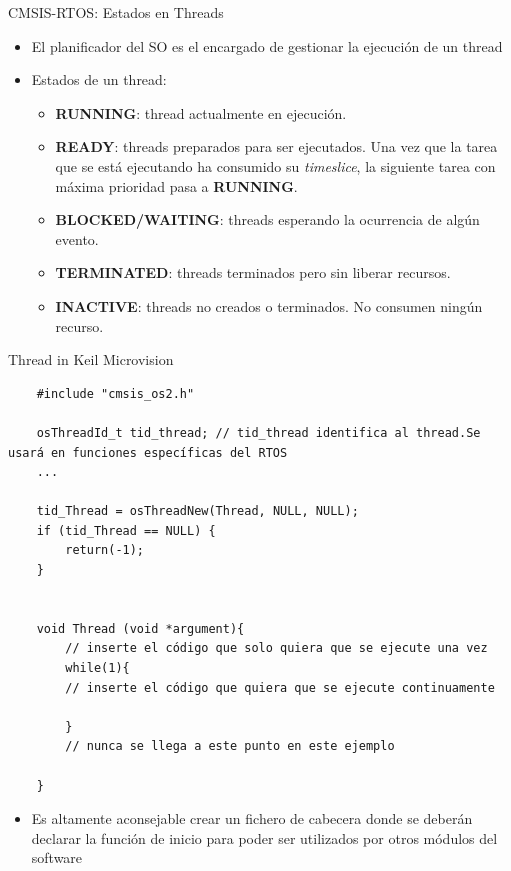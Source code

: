\begin{frame}{CMSIS-RTOS: Estados en Threads}
    \begin{itemize}
        \item El planificador del SO es el encargado de gestionar la ejecución de un thread
        \item Estados de un thread:
       \begin{itemize}
          \item \textbf{RUNNING}: thread actualmente en ejecución.
          \item \textbf{READY}: threads preparados para ser ejecutados. Una vez que la tarea que se está ejecutando ha consumido su \textit{timeslice}, la siguiente tarea con máxima prioridad pasa a \textbf{RUNNING}.
          \item \textbf{BLOCKED/WAITING}: threads esperando la ocurrencia de algún evento.
          \item \textbf{TERMINATED}: threads terminados pero sin liberar recursos.
          \item \textbf{INACTIVE}: threads no creados o terminados. No consumen ningún recurso.
        \end{itemize}
    \end{itemize}
    
\end{frame}

\begin{frame}[fragile]{Thread in Keil Microvision}
    \begin{verbatim}
    #include "cmsis_os2.h"
    
    osThreadId_t tid_thread; // tid_thread identifica al thread.Se usará en funciones específicas del RTOS
    ...
    
    tid_Thread = osThreadNew(Thread, NULL, NULL);
    if (tid_Thread == NULL) {
        return(-1);
    }


    void Thread (void *argument){
        // inserte el código que solo quiera que se ejecute una vez
        while(1){
        // inserte el código que quiera que se ejecute continuamente
        
        }
        // nunca se llega a este punto en este ejemplo
    
    }
    \end{verbatim}
    \begin{itemize}
        \item Es altamente aconsejable crear un fichero de cabecera donde se deberán declarar la función de inicio para poder ser utilizados por otros módulos del software

    \end{itemize}
\end{frame}

